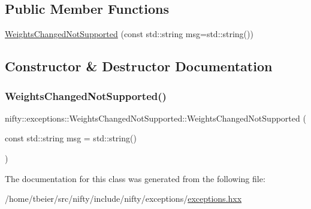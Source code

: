 \subsection*{Public Member Functions}
\begin{DoxyCompactItemize}
\item 
\hyperlink{classnifty_1_1exceptions_1_1WeightsChangedNotSupported_ab90bbdd61bd2472ac5a73b3f60d01661}{Weights\+Changed\+Not\+Supported} (const std\+::string msg=std\+::string())
\end{DoxyCompactItemize}


\subsection{Constructor \& Destructor Documentation}
\mbox{\label{classnifty_1_1exceptions_1_1WeightsChangedNotSupported_ab90bbdd61bd2472ac5a73b3f60d01661}} 
\subsubsection{\texorpdfstring{Weights\+Changed\+Not\+Supported()}{WeightsChangedNotSupported()}}
{\footnotesize\ttfamily nifty\+::exceptions\+::\+Weights\+Changed\+Not\+Supported\+::\+Weights\+Changed\+Not\+Supported (\begin{DoxyParamCaption}\item[{const std\+::string}]{msg = {\ttfamily std\+:\+:string()} }\end{DoxyParamCaption})\hspace{0.3cm}{\ttfamily [inline]}}



The documentation for this class was generated from the following file\+:\begin{DoxyCompactItemize}
\item 
/home/tbeier/src/nifty/include/nifty/exceptions/\hyperlink{exceptions_8hxx}{exceptions.\+hxx}\end{DoxyCompactItemize}
